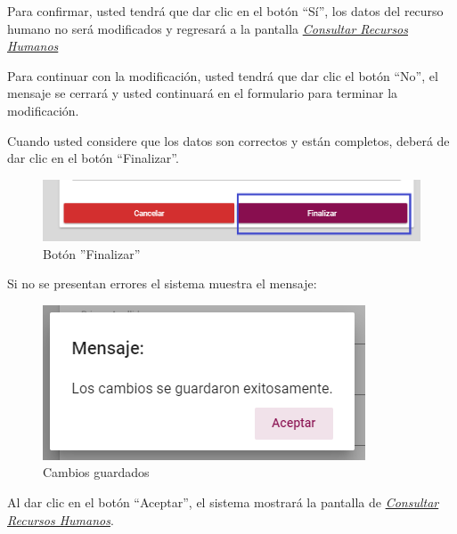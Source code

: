                 Para confirmar, usted tendrá que dar clic en el botón “Sí”, los datos del recurso humano no será modificados  y regresará a la pantalla \hyperlink{consultarRH}{\textit{Consultar Recursos Humanos}}

                Para continuar con la modificación, usted tendrá que  dar clic el botón “No”, el mensaje se cerrará y usted continuará en el formulario para terminar la modificación.

                Cuando usted considere que los datos son correctos y están completos, deberá de dar clic en el botón “Finalizar”.
                \begin{figure}[H]
                    \centering
                    \hypertarget{btnfin}{\includegraphics[width=0.7\linewidth]{images/SP1/BtnFinalizar}}
                    \caption{Botón ''Finalizar''}
                    \label{btnfin}
                \end{figure}

                Si no se presentan errores el sistema muestra el mensaje:

                 \begin{figure}[H]
                    \centering
                    \includegraphics[width=0.4\linewidth]{images/SP1/MSG31}
                    \caption{Cambios guardados}
                    \label{mensaje31}

                \end{figure}

                Al dar clic en el botón “Aceptar”, el sistema mostrará la pantalla de \hyperlink{consultarRH}{\textit{Consultar Recursos Humanos}}.

